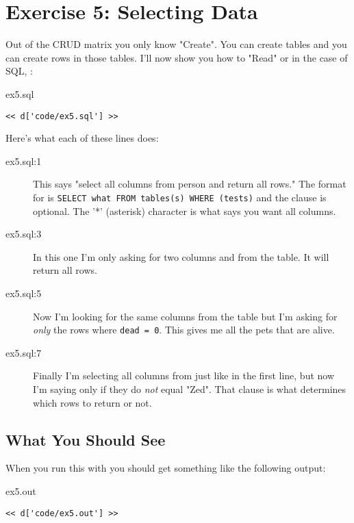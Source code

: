 \chapter{Exercise 5: Selecting Data}

Out of the CRUD matrix you only know "Create".  You can create tables and you
can create rows in those tables.  I'll now show you how to "Read" or in the
case of SQL, :


\begin{code}{ex5.sql}
\begin{Verbatim}
<< d['code/ex5.sql'] >>
\end{Verbatim}
\end{code}

Here's what each of these lines does:

\begin{description}
\item[ex5.sql:1] This says "select all columns from person and return all rows."
    The format for  is \verb|SELECT what FROM tables(s) WHERE (tests)|
    and the  clause is optional.  The '*' (asterisk) character is
    what says you want all columns.
\item[ex5.sql:3] In this one I'm only asking for two columns  and
     from the  table.  It will return all rows.
\item[ex5.sql:5] Now I'm looking for the same columns from the  table
    but I'm asking for \emph{only} the rows where \verb|dead = 0|.  This gives
    me all the pets that are alive.
\item[ex5.sql:7] Finally I'm selecting all columns from  just
    like in the first line, but now I'm saying only if they do \emph{not}
    equal "Zed".  That  clause is what determines which rows
    to return or not.
\end{description}

\section{What You Should See}

When you run this with  you should get something like
the following output:

\begin{code}{ex5.out}
\begin{Verbatim}
<< d['code/ex5.out'] >>
\end{Verbatim}
\end{code}


